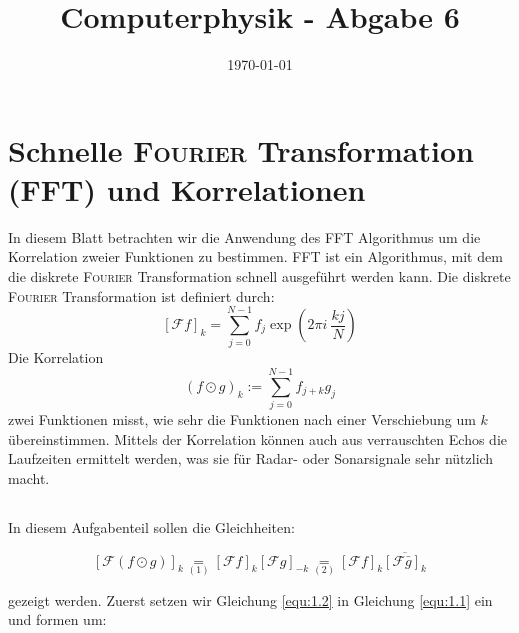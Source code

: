\documentclass[ngerman]{scrartcl}
\title{Computerphysik - Abgabe 6}
\date{\today}
\begin{document}
	\setcounter{section}{9}
	\thispagestyle{fancy}
	\renewcommand{\thesection}{H.\arabic{section}:}
	\renewcommand{\thesubsection}{H\arabic{section}.\arabic{subsection}}
	
\section{Schnelle \textsc{Fourier} Transformation (FFT) und Korrelationen}
In diesem Blatt betrachten wir die Anwendung des FFT Algorithmus
um die Korrelation zweier Funktionen zu bestimmen.
FFT ist ein Algorithmus, mit dem die diskrete \textsc{Fourier} Transformation
schnell ausgeführt werden kann. Die diskrete \textsc{Fourier} Transformation
ist definiert durch:
\begin{equation}
	\label{equ:1.1}
		[\mathcal{F} f]_{k}=\sum_{j=0}^{N-1} f_{j} \exp (2 \pi i ~\frac{kj}{N})
	\end{equation}
Die Korrelation
\begin{equation}
	\label{equ:1.2}
	(f \odot g)_{k}:=\sum_{j=0}^{N-1} f_{j+k} g_{j}
\end{equation}
zwei Funktionen misst, wie sehr die Funktionen
nach einer Verschiebung um $k$ übereinstimmen.
Mittels der Korrelation können
auch aus verrauschten Echos die Laufzeiten ermittelt werden, 
was sie für Radar- oder Sonarsignale sehr nützlich macht.
\subsection{}
In diesem Aufgabenteil sollen die Gleichheiten:

\begin{equation}
\label{equ:1.3}
	[\mathcal{F}(f \odot g)]_{k} \underset{(1)}{=} [\mathcal{F} f]_{k}[\mathcal{F} g]_{-k} \underset{(2)}{=} [\mathcal{F} f]_{k} \overline{[\mathcal{F} \bar{g}]_{k}}
\end{equation}

gezeigt werden.
Zuerst setzen wir Gleichung \ref{equ:1.2}
in Gleichung \ref{equ:1.1} ein und formen um:
\end{document}
